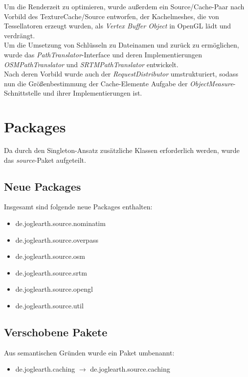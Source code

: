 \documentclass[10pt]{scrreprt}
\begin{document}
Um die Renderzeit zu optimieren, wurde außerdem ein Source/Cache-Paar nach Vorbild des TextureCache/Source entworfen, der Kachelmeshes, die von Tessellatoren erzeugt wurden, als \textit{Vertex Buffer Object} in OpenGL lädt und verdrängt. \\

Um die Umsetzung von Schlüsseln zu Dateinamen und zurück zu ermöglichen, wurde das \textit{PathTranslator}-Interface und deren Implementierungen \textit{OSMPathTranslator} und \textit{SRTMPathTranslator} entwickelt. \\

Nach deren Vorbild wurde auch der \textit{RequestDistributor} umstrukturiert, sodass nun die Größenbestimmung der Cache-Elemente Aufgabe der \textit{ObjectMeasure}-Schnittstelle und ihrer Implementierungen ist.

\section{Packages}

Da durch den Singleton-Ansatz zusätzliche Klassen erforderlich werden, wurde das \textit{source}-Paket aufgeteilt. 

\subsection*{Neue Packages}
Insgesamt sind folgende neue Packages enthalten:
\begin{itemize}
\item de.joglearth.source.nominatim
\item de.joglearth.source.overpass
\item de.joglearth.source.osm
\item de.joglearth.source.srtm
\item de.joglearth.source.opengl
\item de.joglearth.source.util
\end{itemize}

\subsection*{Verschobene Pakete}
Aus semantischen Gründen wurde ein Paket umbenannt:
\begin{itemize}
\item de.joglearth.caching $ \rightarrow $ de.joglearth.source.caching
\end{itemize}

\newpage
\end{document}
